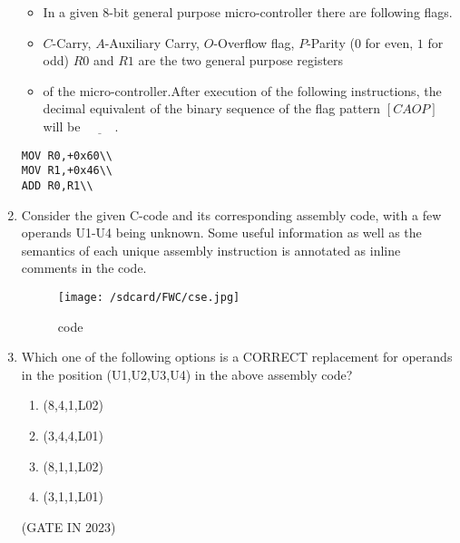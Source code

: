 
\begin{enumerate}

\begin{itemize}
\item 
In a given $8$-bit general purpose micro-controller there are following flags.
\item
$C$-Carry, $A$-Auxiliary Carry, $O$-Overflow flag, $P$-Parity ($0$ for even, $1$ for odd) $R0$ and $R1$ are the two general purpose registers 
\item
of the micro-controller.After execution of the following instructions, the decimal equivalent of the binary sequence of the flag pattern $[CAOP]$ will be $\underline{\hspace{1cm}}$.
\end{itemize}

\begin{lstlisting}
MOV R0,+0x60\\
MOV R1,+0x46\\
ADD R0,R1\\
\end{lstlisting}
    
\label{prob:gate in 41}
\item
Consider the given C-code and its corresponding assembly code, with a few operands U1-U4 being unknown. 
Some useful information as well as the semantics of each unique assembly instruction is annotated as inline comments in the code.

\begin{figure}
\centering                          
\texttt{[image: /sdcard/FWC/cse.jpg]}        
\caption{code}                     
\label{fig:code}
\end{figure}

\item
Which one of the following options is a CORRECT replacement for operands in the position (U1,U2,U3,U4) in the above assembly code?                     
\begin{enumerate}[label=(\Alph*)]  
\item (8,4,1,L02)\\                  
\item (3,4,4,L01)\\
\item (8,1,1,L02)\\                  
\item (3,1,1,L01)\\                  
\end{enumerate}

\hfill(GATE IN 2023)

\end{enumerate}                    
